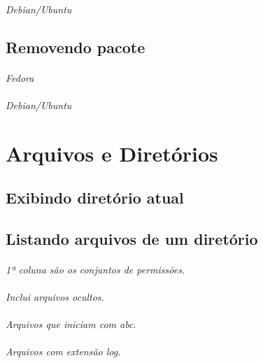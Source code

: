 \documentclass[a4paper,9pt]{extarticle}
\begin{document}
\begin{multicols}{2}
	\paragraph{} \emph{Debian/Ubuntu}
	
\subsection{Removendo pacote}
	\paragraph{} \emph{Fedora}
	
	\paragraph{} \emph{Debian/Ubuntu}
\section{Arquivos e Diretórios}
\subsection{Exibindo diretório atual}

	
\subsection{Listando arquivos de um diretório}
	
	\paragraph{} \emph{1ª coluna são os conjuntos de permissões.}
	\paragraph{} \emph{Inclui arquivos ocultos.}
	\paragraph{} \emph{Arquivos que iniciam com abc.}
	\paragraph{} \emph{Arquivos com extensão log.}
	

\end{multicols}
\end{document}
